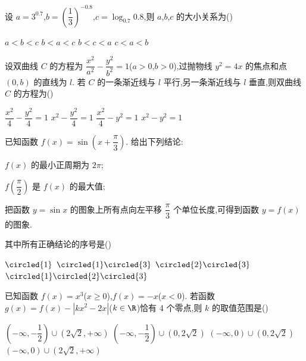 \begin{problem}
设 \(a=3^{0.7}\),\(b=\left( \dfrac13 \right)^{-0.8}\),\(c=\log_{0.7}0.8\),则 \(a\),\(b\),\(c\) 的大小关系为(\quad)

\choices
    {\(a<b<c\)}
    {\(b<a<c\)}
    {\(b<c<a\)}
    {\(c<a<b\)}
\end{problem}

\begin{problem}
设双曲线 \(C\) 的方程为 \(\dfrac{x^2}{a^2}-\dfrac{y^2}{b^2}=1\)(\(a>0\),\(b>0\)),过抛物线 \(y^2=4x\) 的焦点和点 \((0,b)\) 的直线为 \(l\). 若 \(C\) 的一条渐近线与 \(l\) 平行,另一条渐近线与 \(l\) 垂直,则双曲线 \(C\) 的方程为(\quad)

\choices
    {\(\dfrac{x^2}{4}-\dfrac{y^2}{4}=1\)}
    {\(x^2-\dfrac{y^2}{4}=1\)}
    {\(\dfrac{x^2}{4}-y^2=1\)}
    {\(x^2-y^2=1\)}
\end{problem}

\begin{problem}
已知函数 \(f(x)=\sin\left( x+\dfrac{\pi}{3} \right)\). 给出下列结论:

\begin{circlelist}
\item \(f(x)\) 的最小正周期为 \(2\pi\);

\item \(f\left( \dfrac{\pi}{2} \right)\) 是 \(f(x)\) 的最大值;

\item 把函数 \(y=\sin x\) 的图象上所有点向左平移 \(\dfrac{\pi}{3}\) 个单位长度,可得到函数 \(y=f(x)\) 的图象.
\end{circlelist}

其中所有正确结论的序号是(\quad)

\choices
    {\(\circled{1}\)}
    {\(\circled{1}\circled{3}\)}
    {\(\circled{2}\circled{3}\)}
    {\(\circled{1}\circled{2}\circled{3}\)}
\end{problem}

\begin{problem}
已知函数 \(f(x)=x^3\)(\(x\ge 0\)),\(f(x)=-x\)(\(x<0\)). 若函数 \(g(x)=f(x)-\left| kx^2-2x \right|\)(\(k\in\R\))恰有 4 个零点,则 \(k\) 的取值范围是(\quad)

\choices
    {\(\left( -\infty,-\dfrac12 \right)\cup\left( 2\sqrt2,+\infty \right)\)}
    {\(\left( -\infty,-\dfrac12 \right)\cup\left( 0,2\sqrt2 \right)\)}
    {\(\left( -\infty,0 \right)\cup\left( 0,2\sqrt2 \right)\)}
    {\(\left( -\infty,0 \right)\cup\left( 2\sqrt2,+\infty \right)\)}
\end{problem}


